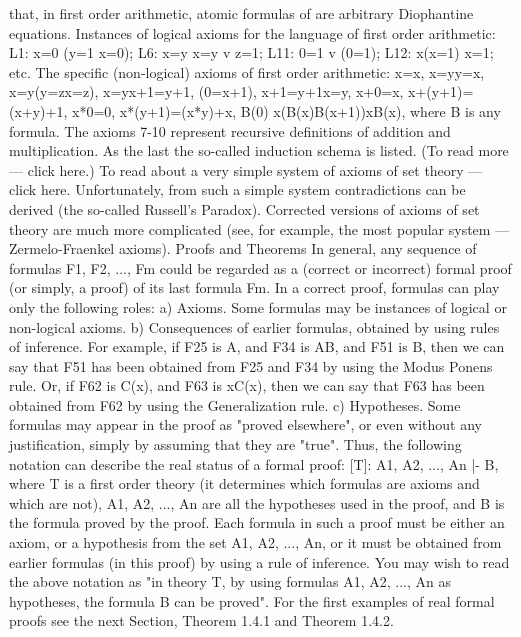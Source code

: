 that, in first order arithmetic, atomic formulas of are arbitrary Diophantine equations.
Instances of logical axioms for the language of first order arithmetic:
L1: x=0 \IMPLIES  (y=1 \IMPLIES  x=0);
L6: x=y \IMPLIES  x=y v z=1;
L11: 0=1 v \neg (0=1);
L12: \forall x(x=1) \IMPLIES  x=1;
etc.
The specific (non-logical) axioms of first order arithmetic:
x=x,
x=y\IMPLIES y=x,
x=y\IMPLIES (y=z\IMPLIES x=z),
x=y\IMPLIES x+1=y+1,
\neg (0=x+1),
x+1=y+1\IMPLIES x=y,
x+0=x,
x+(y+1)=(x+y)+1,
x*0=0,
x*(y+1)=(x*y)+x,
B(0) \AND  \forall x(B(x)\IMPLIES B(x+1))\IMPLIES \forall xB(x), where B is any formula.
The axioms 7-10 represent recursive definitions of addition and multiplication. As the last the so-called induction schema is
listed. (To read more --- click here.)
To read about a very simple system of axioms of set theory --- click here. Unfortunately, from such a simple system
contradictions can be derived (the so-called Russell's Paradox). Corrected versions of axioms of set theory are much more
complicated (see, for example, the most popular system --- Zermelo-Fraenkel axioms).
Proofs and Theorems
In general, any sequence of formulas F1, F2, ..., Fm could be regarded as a (correct or incorrect) formal
proof (or simply, a proof) of its last formula Fm. In a correct proof, formulas can play only the following
roles:
a) Axioms. Some formulas may be instances of logical or non-logical axioms.
b) Consequences of earlier formulas, obtained by using rules of inference. For example, if F25 is A, and
F34 is A\IMPLIES B, and F51 is B, then we can say that F51 has been obtained from F25 and F34 by using the
Modus Ponens rule. Or, if F62 is C(x), and F63 is \forall xC(x), then we can say that F63 has been obtained
from F62 by using the Generalization rule.
c) Hypotheses. Some formulas may appear in the proof as "proved elsewhere", or even without any
justification, simply by assuming that they are "true".
Thus, the following notation can describe the real status of a formal proof:
[T]: A1, A2, ..., An |- B,
where T is a first order theory (it determines which formulas are axioms and which are not), A1, A2, ..., An
are all the hypotheses used in the proof, and B is the formula proved by the proof. Each formula in such a
proof must be either an axiom, or a hypothesis from the set A1, A2, ..., An, or it must be obtained from
earlier formulas (in this proof) by using a rule of inference. You may wish to read the above notation as
"in theory T, by using formulas A1, A2, ..., An as hypotheses, the formula B can be proved".
For the first examples of real formal proofs see the next Section, Theorem 1.4.1 and Theorem 1.4.2.
